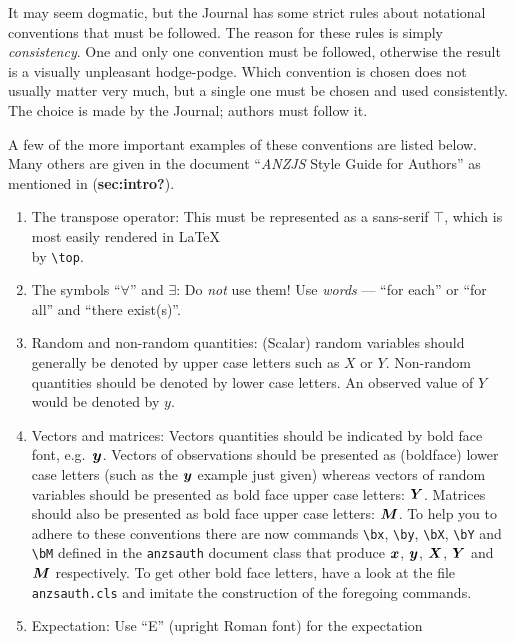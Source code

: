 \documentclass[
  times,
  doublespace]{anzsauth}
\providecommand{\tightlist}{%
  \setlength{\itemsep}{0pt}\setlength{\parskip}{0pt}}\usepackage{longtable,booktabs,array}
\begin{document}
It may seem dogmatic, but the Journal has some strict rules about
notational conventions that must be followed. The reason for these rules
is simply \emph{consistency}. One and only one convention must be
followed, otherwise the result is a visually unpleasant hodge-podge.
Which convention is chosen does not usually matter very much, but a
single one must be chosen and used consistently. The choice is made by
the Journal; authors must follow it.

A few of the more important examples of these conventions are listed
below. Many others are given in the document ``\emph{ANZJS} Style Guide
for Authors'' as mentioned in (\textbf{sec:intro?}).

\begin{enumerate}
\def\labelenumi{\arabic{enumi}.}
\tightlist
\item
  The transpose operator: This must be represented as a sans-serif
  \(\top\), which is most easily rendered in \LaTeX\\
  by \texttt{\textbackslash{}top}.
\item
  The symbols ``\(\forall\)'' and \(\exists\): Do \emph{not} use them!
  Use \emph{words} --- ``for each'' or ``for all'' and ``there
  exist(s)''.
\item
  Random and non-random quantities: (Scalar) random variables should
  generally be denoted by upper case letters such as \(X\) or \(Y\).
  Non-random quantities should be denoted by lower case letters. An
  observed value of \(Y\) would be denoted by \(y\).
\item
  Vectors and matrices: Vectors quantities should be indicated by bold
  face font, e.g.~\(\mbox{$\boldsymbol{y}$}\). Vectors of observations should be presented
  as (boldface) lower case letters (such as the \(\mbox{$\boldsymbol{y}$}\) example just
  given) whereas vectors of random variables should be presented as bold
  face upper case letters: \(\mbox{$\boldsymbol{Y}$}\). Matrices should also be presented as
  bold face upper case letters: \(\mbox{$\boldsymbol{M}$}\). To help you to adhere to these
  conventions there are now commands \texttt{\textbackslash{}bx},
  \texttt{\textbackslash{}by}, \texttt{\textbackslash{}bX},
  \texttt{\textbackslash{}bY} and \texttt{\textbackslash{}bM} defined in
  the \texttt{anzsauth} document class that produce \(\mbox{$\boldsymbol{x}$}\), \(\mbox{$\boldsymbol{y}$}\),
  \(\mbox{$\boldsymbol{X}$}\), \(\mbox{$\boldsymbol{Y}$}\) and \(\mbox{$\boldsymbol{M}$}\) respectively. To get other bold face
  letters, have a look at the file \texttt{anzsauth.cls} and imitate the
  construction of the foregoing commands.
\item
  Expectation: Use ``E'' (upright Roman font) for the expectation

\end{enumerate}
\end{document}
